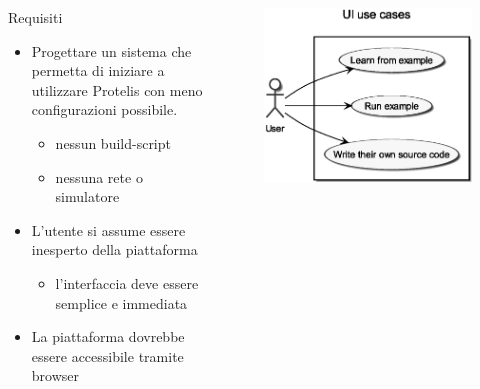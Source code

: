     \begin{frame}{\insertsectionhead}{\insertsubsectionhead}
      \begin{columns}
        \begin{column}{.5\textwidth}
          \begin{block}{Requisiti}
            \begin{itemize}
              \item
                Progettare un sistema che permetta di iniziare a utilizzare Protelis con meno configurazioni possibile.
                \begin{itemize}
                  \item nessun build-script
                  \item nessuna rete o simulatore
                \end{itemize}
              \item
                L'utente si assume essere inesperto della piattaforma
                \begin{itemize}
                  \item l'interfaccia deve essere semplice e immediata
                \end{itemize}
              \item La piattaforma dovrebbe essere accessibile tramite browser
            \end{itemize}
          \end{block}
        \end{column}
        \begin{column}{.45\textwidth}
          \begin{figure}
            \includegraphics[width=\textwidth]{res/uml/use-cases-frontend.eps}
          \end{figure}
        \end{column}
      \end{columns}
    \end{frame}

